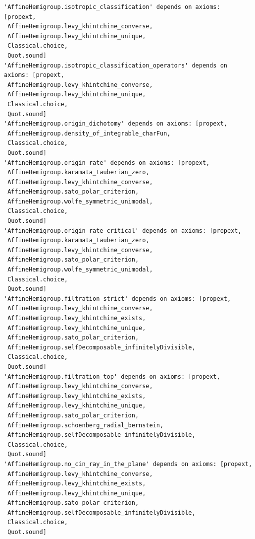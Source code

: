 \begin{verbatim}
'AffineHemigroup.isotropic_classification' depends on axioms: [propext,
 AffineHemigroup.levy_khintchine_converse,
 AffineHemigroup.levy_khintchine_unique,
 Classical.choice,
 Quot.sound]
'AffineHemigroup.isotropic_classification_operators' depends on axioms: [propext,
 AffineHemigroup.levy_khintchine_converse,
 AffineHemigroup.levy_khintchine_unique,
 Classical.choice,
 Quot.sound]
'AffineHemigroup.origin_dichotomy' depends on axioms: [propext,
 AffineHemigroup.density_of_integrable_charFun,
 Classical.choice,
 Quot.sound]
'AffineHemigroup.origin_rate' depends on axioms: [propext,
 AffineHemigroup.karamata_tauberian_zero,
 AffineHemigroup.levy_khintchine_converse,
 AffineHemigroup.sato_polar_criterion,
 AffineHemigroup.wolfe_symmetric_unimodal,
 Classical.choice,
 Quot.sound]
'AffineHemigroup.origin_rate_critical' depends on axioms: [propext,
 AffineHemigroup.karamata_tauberian_zero,
 AffineHemigroup.levy_khintchine_converse,
 AffineHemigroup.sato_polar_criterion,
 AffineHemigroup.wolfe_symmetric_unimodal,
 Classical.choice,
 Quot.sound]
'AffineHemigroup.filtration_strict' depends on axioms: [propext,
 AffineHemigroup.levy_khintchine_converse,
 AffineHemigroup.levy_khintchine_exists,
 AffineHemigroup.levy_khintchine_unique,
 AffineHemigroup.sato_polar_criterion,
 AffineHemigroup.selfDecomposable_infinitelyDivisible,
 Classical.choice,
 Quot.sound]
'AffineHemigroup.filtration_top' depends on axioms: [propext,
 AffineHemigroup.levy_khintchine_converse,
 AffineHemigroup.levy_khintchine_exists,
 AffineHemigroup.levy_khintchine_unique,
 AffineHemigroup.sato_polar_criterion,
 AffineHemigroup.schoenberg_radial_bernstein,
 AffineHemigroup.selfDecomposable_infinitelyDivisible,
 Classical.choice,
 Quot.sound]
'AffineHemigroup.no_cin_ray_in_the_plane' depends on axioms: [propext,
 AffineHemigroup.levy_khintchine_converse,
 AffineHemigroup.levy_khintchine_exists,
 AffineHemigroup.levy_khintchine_unique,
 AffineHemigroup.sato_polar_criterion,
 AffineHemigroup.selfDecomposable_infinitelyDivisible,
 Classical.choice,
 Quot.sound]
\end{verbatim}
\endgroup
